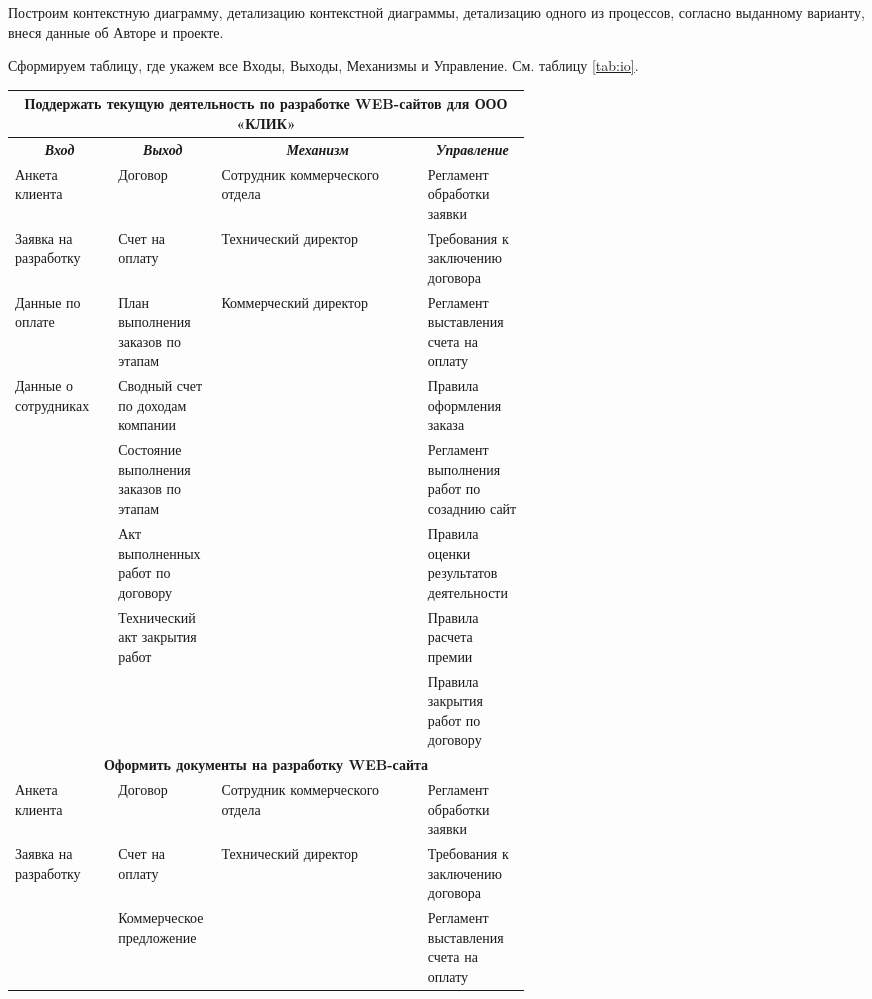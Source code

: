 \documentclass[a4paper,14pt]{extarticle}
\begin{document}
	\problem Построим контекстную диаграмму, детализацию контекстной
	диаграммы, детализацию одного из процессов, согласно выданному
	варианту, внеся данные об Авторе и проекте. %
	
	\problem Сформируем таблицу, где укажем все Входы, Выходы,
	Механизмы и Управление. См. таблицу \ref{tab:io}.
\newpage
	
\begin{table}[htbp]
	\scriptsize
	\begin{tabular}{|p{0.2\linewidth}|p{0.2\linewidth}|l|p{0.2\linewidth}|}
		\hline
		\multicolumn{ 4}{|c|}{\textbf{Поддержать текущую деятельность по разработке WEB-сайтов для ООО «КЛИК»}} \\ \hline
		\multicolumn{1}{|c|}{\textbf{\textit{Вход}}} & \multicolumn{1}{c|}{\textbf{\textit{Выход}}} & \multicolumn{1}{c|}{\textbf{\textit{Механизм}}} & \multicolumn{1}{c|}{\textbf{\textit{Управление}}} \\ \hline
		Анкета клиента & Договор & Сотрудник коммерческого отдела & Регламент обработки заявки \\ \hline
		Заявка на разработку & Счет на оплату & Технический директор & Требования к заключению договора \\ \hline
		Данные по оплате & План выполнения заказов по этапам & Коммерческий директор & Регламент выставления счета на оплату \\ \hline
		Данные о сотрудниках & Сводный счет по доходам компании &  & Правила оформления заказа \\ \hline
		& Состояние выполнения заказов по этапам &  & Регламент выполнения работ по созаднию сайт \\ \hline
		& Акт выполненных работ по договору &  & Правила оценки результатов деятельности \\ \hline
		& Технический акт закрытия работ &  & Правила расчета премии \\ \hline
		&  &  & Правила закрытия работ по договору \\ \hline
		\multicolumn{ 4}{|c|}{\textbf{Оформить документы на разработку WEB-сайта}} \\ \hline
		Анкета клиента & Договор & Сотрудник коммерческого отдела & Регламент обработки заявки \\ \hline
		Заявка на разработку & Счет на оплату & Технический директор & Требования к заключению договора \\ \hline
		& Коммерческое предложение &  & Регламент выставления счета на оплату \\ \hline

\end{tabular}
\end{table}
\end{document}
